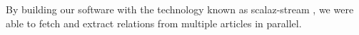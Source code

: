 By building our software with the technology known as scalaz-stream \cite{scalaz2015}, we were able to fetch and extract relations
from multiple articles in parallel.
